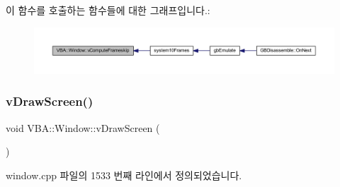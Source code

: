 이 함수를 호출하는 함수들에 대한 그래프입니다.\+:
\nopagebreak
\begin{figure}[H]
\begin{center}
\leavevmode
\includegraphics[width=350pt]{class_v_b_a_1_1_window_abcfa3555126b7804609a8438ece3266e_icgraph}
\end{center}
\end{figure}
\mbox{\label{class_v_b_a_1_1_window_af82e47600303a15b2aa4fdffb90df394}} 
\subsubsection{\texorpdfstring{v\+Draw\+Screen()}{vDrawScreen()}}
{\footnotesize\ttfamily void V\+B\+A\+::\+Window\+::v\+Draw\+Screen (\begin{DoxyParamCaption}{ }\end{DoxyParamCaption})}



window.\+cpp 파일의 1533 번째 라인에서 정의되었습니다.


